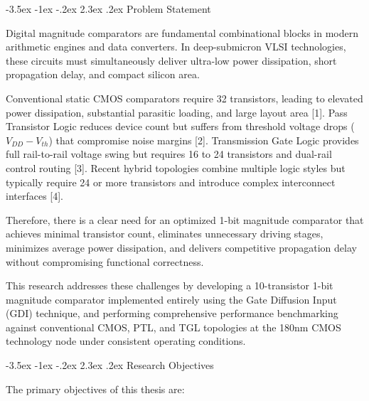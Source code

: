 \documentclass[12pt,a4paper,oneside]{report}
\makeatletter
\renewcommand\section{\@startsection {section}{1}{\z@}%
                                   {-3.5ex \@plus -1ex \@minus -.2ex}%
                                   {2.3ex \@plus.2ex}%
                                   {\normalfont\normalsize\bfseries}}
\makeatother
\begin{document}
\section{Problem Statement}

Digital magnitude comparators are fundamental combinational blocks in modern arithmetic engines and data converters. In deep-submicron VLSI technologies, these circuits must simultaneously deliver ultra-low power dissipation, short propagation delay, and compact silicon area.

Conventional static CMOS comparators require 32 transistors, leading to elevated power dissipation, substantial parasitic loading, and large layout area [1]. Pass Transistor Logic reduces device count but suffers from threshold voltage drops ($V_{DD} - V_{th}$) that compromise noise margins [2]. Transmission Gate Logic provides full rail-to-rail voltage swing but requires 16 to 24 transistors and dual-rail control routing [3]. Recent hybrid topologies combine multiple logic styles but typically require 24 or more transistors and introduce complex interconnect interfaces [4].

Therefore, there is a clear need for an optimized 1-bit magnitude comparator that achieves minimal transistor count, eliminates unnecessary driving stages, minimizes average power dissipation, and delivers competitive propagation delay without compromising functional correctness.

This research addresses these challenges by developing a 10-transistor 1-bit magnitude comparator implemented entirely using the Gate Diffusion Input (GDI) technique, and performing comprehensive performance benchmarking against conventional CMOS, PTL, and TGL topologies at the 180nm CMOS technology node under consistent operating conditions.

\section{Research Objectives}

The primary objectives of this thesis are:
\end{document}
